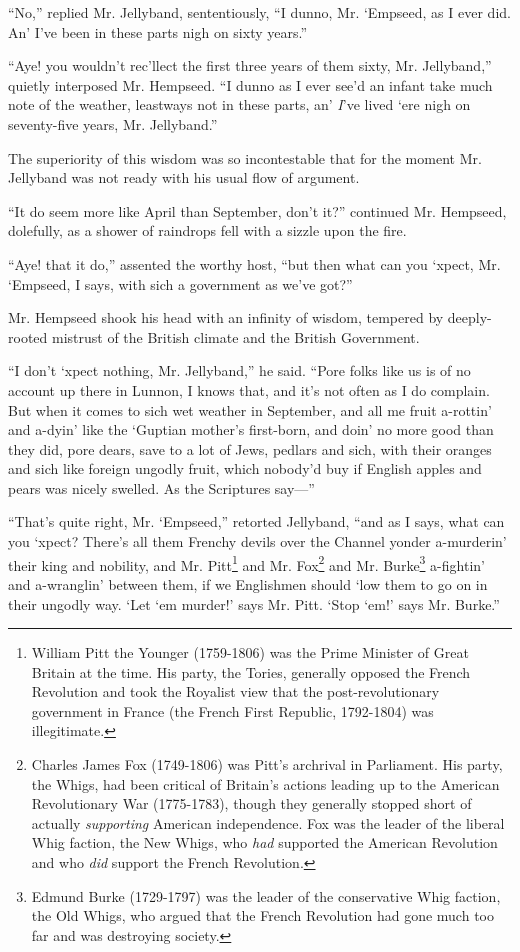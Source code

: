 \documentclass[paper=5.5in:8.5in,BCOR=7mm,twoside,DIV=calc,12pt,usegeometry,chapterprefix,endperiod,headings=big]{scrbook}
\begin{document}
\enquote{No,} replied Mr. Jellyband, sententiously, \enquote{I dunno, Mr. `Empseed, as I ever did. An’ I've been in these parts nigh on sixty years.}

\enquote{Aye! you wouldn't rec'llect the first three years of them sixty, Mr. Jellyband,} quietly interposed Mr. Hempseed. \enquote{I dunno as I ever see'd an infant take much note of the weather, leastways not in these parts, an’ \textit{I}'ve lived `ere nigh on seventy-five years, Mr. Jellyband.}

The superiority of this wisdom was so incontestable that for the moment Mr. Jellyband was not ready with his usual flow of argument.

\enquote{It do seem more like April than September, don't it?} continued Mr. Hempseed, dolefully, as a shower of raindrops fell with a sizzle upon the fire.

\enquote{Aye! that it do,} assented the worthy host, \enquote{but then what can you `xpect, Mr. `Empseed, I says, with sich a government as we've got?}

Mr. Hempseed shook his head with an infinity of wisdom, tempered by deeply-rooted mistrust of the British climate and the British Government.

\enquote{I don't `xpect nothing, Mr. Jellyband,} he said. \enquote{Pore folks like us is of no account up there in Lunnon, I knows that, and it's not often as I do complain. But when it comes to sich wet weather in September, and all me fruit a-rottin’ and a-dyin’ like the `Guptian mother's first-born, and doin’ no more good than they did, pore dears, save to a lot of Jews, pedlars and sich, with their oranges and sich like foreign ungodly fruit, which nobody'd buy if English apples and pears was nicely swelled. As the Scriptures say---}

\enquote{That's quite right, Mr. `Empseed,} retorted Jellyband, \enquote{and as I says, what can you `xpect? There's all them Frenchy devils over the Channel yonder a-murderin’ their king and nobility, and Mr. Pitt\footnote{William Pitt the Younger (1759-1806) was the Prime Minister of Great Britain at the time. His party, the Tories, generally opposed the French Revolution and took the Royalist view that the post-revolutionary government in France (the French First Republic, 1792-1804) was illegitimate.} and Mr. Fox\footnote{Charles James Fox (1749-1806) was Pitt's archrival in Parliament. His party, the Whigs, had been critical of Britain's actions leading up to the American Revolutionary War (1775-1783), though they generally stopped short of actually \textit{supporting} American independence. Fox was the leader of the liberal Whig faction, the New Whigs, who \textit{had} supported the American Revolution and who \textit{did} support the French Revolution.} and Mr. Burke\footnote{Edmund Burke (1729-1797) was the leader of the conservative Whig faction, the Old Whigs, who argued that the French Revolution had gone much too far and was destroying society.}  a-fightin’ and a-wranglin’ between them, if we Englishmen should `low them to go on in their ungodly way. \enquote{Let `em murder!} says Mr. Pitt. \enquote{Stop `em!} says Mr. Burke.}
\end{document}

